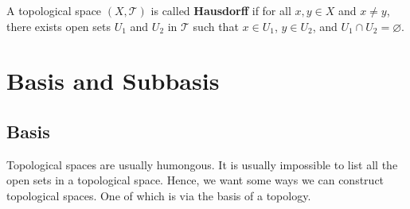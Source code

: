 \documentclass[article,11pt, reqno]{article}
\theoremstyle{remark}
\newcommand{\tb}{\textbf}
\newcommand{\mc}{\mathcal}
\newcommand{\<}{\langle}
\renewcommand{\>}{\rangle}
\begin{document}
A topological space $(X,\mc T)$ is called \tb{Hausdorff} if for all $x,y\in X$ and $x\neq y$, there exists open sets $U_1$ and $U_2$ in $\mc T$ such that $x\in U_1$, $y\in U_2$, and $U_1\cap U_2=\varnothing$.


\section{Basis and Subbasis}
\subsection*{Basis}
Topological spaces are usually humongous. It is usually impossible to list all the open sets in a topological space. Hence, we want some ways we can construct topological spaces. One of which is via the basis of a topology.
\end{document}
